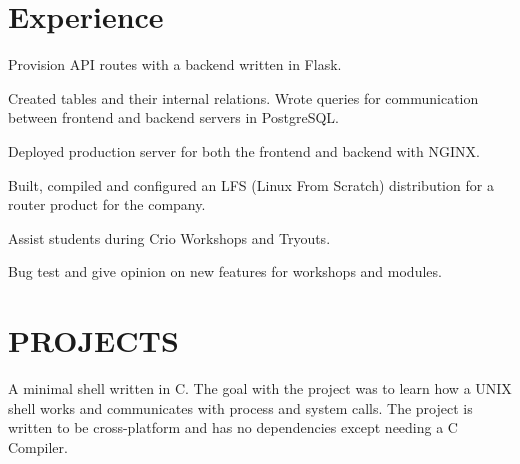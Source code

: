 \documentclass[]{resume-openfont}
\begin{document}
\begin{minipage}[t]{0.66\textwidth}


\section{Experience}

\vspace{\topsep} %
\begin{tightemize}
\item Provision API routes with a backend written in Flask.
\item Created tables and their internal relations. Wrote queries for communication between frontend and backend servers in PostgreSQL.
\item Deployed production server for both the frontend and backend with NGINX.
\end{tightemize}
\sectionsep


\begin{tightemize}
\item Built, compiled and configured an LFS (Linux From Scratch) distribution for a router product for the company.
\end{tightemize}
\sectionsep

\begin{tightemize}
\item Assist students during Crio Workshops and Tryouts.
\item Bug test and give opinion on new features for workshops and modules.
\end{tightemize}
\sectionsep


\section{PROJECTS}

A minimal shell written in C. The goal with the project was to learn how a UNIX shell works and communicates with process and system calls. The project is written to be cross-platform and has no dependencies except needing a C Compiler.\\
\sectionsep


\end{minipage}
\end{document}

